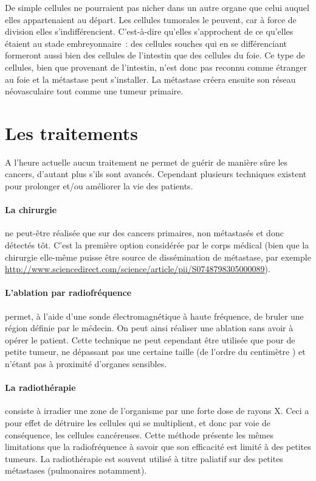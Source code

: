 \documentclass[main.tex]{subfiles}
\begin{document}
De simple cellules ne pourraient pas nicher dans un autre organe que celui auquel elles appartenaient au départ. Les cellules tumorales le peuvent, car à force de division elles s'indifférencient. C'est-à-dire qu'elles s'approchent de ce qu'elles étaient au stade embreyonnaire~: des cellules souches qui en se différenciant formeront aussi bien des cellules de l'intestin que des cellules du foie. Ce type de cellules, bien que provenant de l'intestin, n'est donc pas reconnu comme étranger au foie et la métastase peut s'installer. La métastase créera ensuite son réseau néovasculaire tout comme une tumeur primaire.

\section{Les traitements}
A l'heure actuelle aucun traitement ne permet de guérir de manière sûre les cancers, d'autant plus s'ils sont avancés.  Cependant plusieurs techniques existent pour prolonger et/ou améliorer la vie des patients.
\paragraph{La chirurgie} ne peut-être réalisée que sur des cancers primaires, non métastasés et donc détectés tôt. C'est la première option considérée par le corps médical (bien que la chirurgie elle-même puisse être source de dissémination de métastase, \cf par exemple  \url{http://www.sciencedirect.com/science/article/pii/S0748798305000089}).

\paragraph{L'ablation par radiofréquence} permet, à l'aide d'une sonde électromagnétique à haute fréquence, de bruler une région définie par le médecin. On peut ainsi réaliser une ablation sans avoir à opérer le patient. Cette technique  
ne peut cependant être utilisée que pour de petite tumeur, ne dépassant pas une certaine taille (de l'ordre du centimètre ) et n'étant pas à proximité d'organes sensibles. 

\paragraph{La radiothérapie} consiste à irradier une zone de l'organisme par une forte dose de rayons X. Ceci a pour effet de détruire les cellules qui se multiplient, et donc par voie de conséquence, les cellules cancéreuses. Cette méthode présente les mêmes limitations que la radiofréquence à savoir que son efficacité est limité à des petites tumeurs. La radiothérapie est souvent utilisé à titre paliatif sur des petites métastases (pulmonaires notamment).
\end{document}
